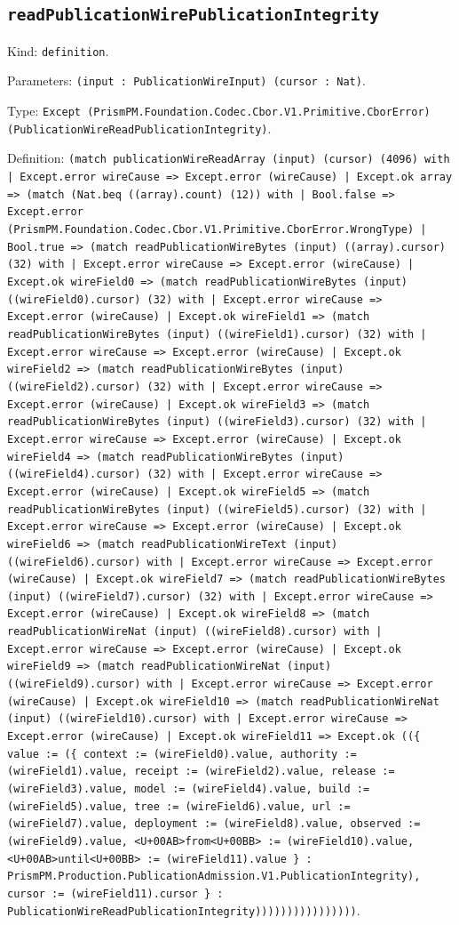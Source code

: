 \documentclass[11pt]{article}
\begin{document}
\subsection*{\texttt{readPublicationWirePublicationIntegrity}}
\noindent Kind: \texttt{definition}.\par
\noindent Parameters: \texttt{(input : PublicationWireInput) (cursor : Nat)}.\par
\noindent Type: \texttt{Except (PrismPM.Foundation.Codec.Cbor.V1.Primitive.CborError) (PublicationWireReadPublicationIntegrity)}.\par
\noindent Definition: \texttt{(match publicationWireReadArray (input) (cursor) (4096) with | Except.error wireCause => Except.error (wireCause) | Except.ok array => (match (Nat.beq ((array).count) (12)) with | Bool.false => Except.error (PrismPM.Foundation.Codec.Cbor.V1.Primitive.CborError.WrongType) | Bool.true => (match readPublicationWireBytes (input) ((array).cursor) (32) with | Except.error wireCause => Except.error (wireCause) | Except.ok wireField0 => (match readPublicationWireBytes (input) ((wireField0).cursor) (32) with | Except.error wireCause => Except.error (wireCause) | Except.ok wireField1 => (match readPublicationWireBytes (input) ((wireField1).cursor) (32) with | Except.error wireCause => Except.error (wireCause) | Except.ok wireField2 => (match readPublicationWireBytes (input) ((wireField2).cursor) (32) with | Except.error wireCause => Except.error (wireCause) | Except.ok wireField3 => (match readPublicationWireBytes (input) ((wireField3).cursor) (32) with | Except.error wireCause => Except.error (wireCause) | Except.ok wireField4 => (match readPublicationWireBytes (input) ((wireField4).cursor) (32) with | Except.error wireCause => Except.error (wireCause) | Except.ok wireField5 => (match readPublicationWireBytes (input) ((wireField5).cursor) (32) with | Except.error wireCause => Except.error (wireCause) | Except.ok wireField6 => (match readPublicationWireText (input) ((wireField6).cursor) with | Except.error wireCause => Except.error (wireCause) | Except.ok wireField7 => (match readPublicationWireBytes (input) ((wireField7).cursor) (32) with | Except.error wireCause => Except.error (wireCause) | Except.ok wireField8 => (match readPublicationWireNat (input) ((wireField8).cursor) with | Except.error wireCause => Except.error (wireCause) | Except.ok wireField9 => (match readPublicationWireNat (input) ((wireField9).cursor) with | Except.error wireCause => Except.error (wireCause) | Except.ok wireField10 => (match readPublicationWireNat (input) ((wireField10).cursor) with | Except.error wireCause => Except.error (wireCause) | Except.ok wireField11 => Except.ok ((\{ value := (\{ context := (wireField0).value, authority := (wireField1).value, receipt := (wireField2).value, release := (wireField3).value, model := (wireField4).value, build := (wireField5).value, tree := (wireField6).value, url := (wireField7).value, deployment := (wireField8).value, observed := (wireField9).value, <U+00AB>from<U+00BB> := (wireField10).value, <U+00AB>until<U+00BB> := (wireField11).value \} : PrismPM.Production.PublicationAdmission.V1.PublicationIntegrity), cursor := (wireField11).cursor \} : PublicationWireReadPublicationIntegrity))))))))))))))))}.\par
\end{document}
